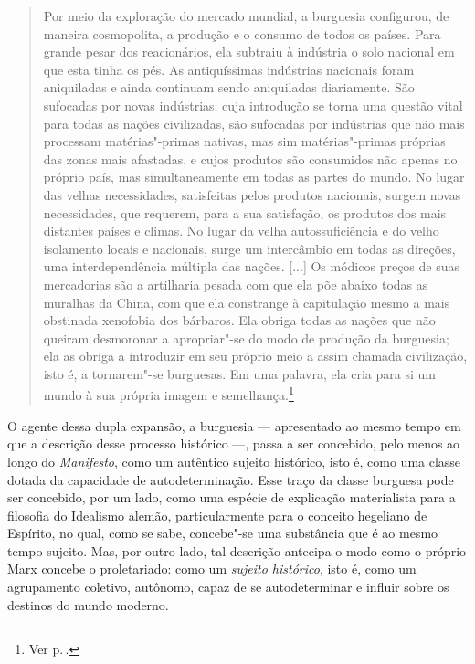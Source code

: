 \begin{quote} 
Por meio da exploração do mercado mundial, a burguesia configurou, de
maneira cosmopolita, a produção e o consumo de todos os países. Para
grande pesar dos reacionários, ela subtraiu à indústria o solo nacional
em que esta tinha os pés. As antiquíssimas indústrias nacionais foram
aniquiladas e ainda continuam sendo aniquiladas diariamente. São
sufocadas por novas indústrias, cuja introdução se torna uma questão
vital para todas as nações civilizadas, são sufocadas por indústrias que não mais
processam matérias"-primas nativas, mas sim matérias"-primas próprias
das zonas mais afastadas, e cujos produtos são consumidos não apenas no
próprio país, mas simultaneamente em todas as partes do mundo. No lugar
das velhas necessidades, satisfeitas pelos produtos nacionais, surgem
novas necessidades, que requerem, para a sua satisfação, os produtos dos
mais distantes países e climas. No lugar da velha autossuficiência e
do velho isolamento locais e nacionais, surge um intercâmbio em
todas as direções, uma interdependência múltipla das nações. [...] Os
módicos preços de suas mercadorias são a artilharia pesada com que ela
põe abaixo todas as muralhas da China, com que ela constrange à
capitulação mesmo a mais obstinada xenofobia dos bárbaros. Ela obriga
todas as nações que não queiram desmoronar a apropriar"-se do modo de
produção da burguesia; ela as obriga a introduzir em seu próprio meio a
assim chamada civilização, isto é, a tornarem"-se burguesas. Em uma
palavra, ela cria para si um mundo à sua própria imagem e semelhança.\footnote{Ver p.\,\pageref{5}.}
\end{quote} 

O agente dessa dupla expansão, a burguesia --- apresentado ao mesmo tempo
em que a descrição desse processo histórico ---, passa a ser concebido,
pelo menos ao longo do \textit{Manifesto}, como um autêntico sujeito
histórico, isto é, como uma classe dotada da capacidade de
autodeterminação. Esse traço da classe burguesa pode ser concebido, por
um lado, como uma espécie de explicação materialista para a filosofia
do Idealismo alemão, particularmente para o conceito hegeliano de
Espírito, no qual, como se sabe, concebe"-se uma substância que é ao
mesmo tempo sujeito. Mas, por outro lado, tal descrição antecipa o
modo como o próprio Marx concebe o proletariado: como um \textit{sujeito
histórico}, isto é, como um agrupamento coletivo, autônomo, capaz de se
autodeterminar e influir sobre os destinos do mundo moderno.

